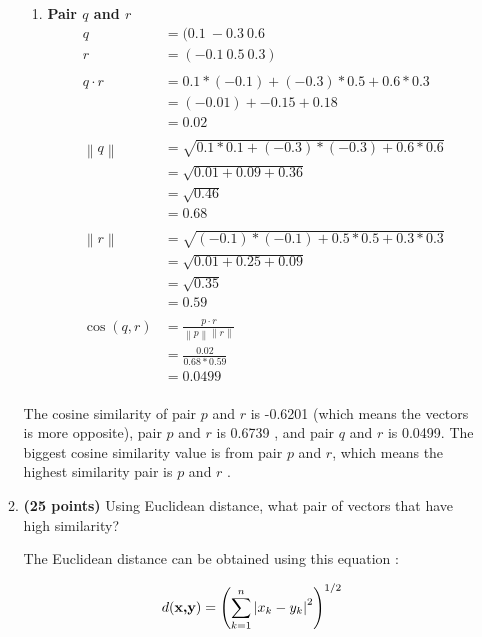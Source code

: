 \documentclass[12pt]{article}%
\begin{document}
\begin{enumerate}
\begin{enumerate}
\begin{enumerate}
			\item \textbf{Pair $q$ and $r$}
			\begin{align*}
				 q & = (0.1 \ -0.3 \ 0.6 \\ 
				 r & = (-0.1 \ 0.5 \ 0.3) \\ 
				 \\
				 q \cdot r & = 0.1 * (-0.1) + (-0.3) * 0.5 + 0.6 * 0.3 \\
				 & = (-0.01) + -0.15 + 0.18 \\
				 & = 0.02\\ 
				 \\
				\left \| q \right \| & = \sqrt{0.1 * 0.1 + (-0.3) * (-0.3) + 0.6*0.6} \\
				 & = \sqrt{0.01 + 0.09 + 0.36} \\ 
				 & = \sqrt{0.46} \\
				 & = 0.68 \\
				 \\
				 \left \| r \right \| & = \sqrt{(-0.1) * (-0.1) + 0.5 * 0.5 + 0.3*0.3} \\
				 & = \sqrt{0.01 + 0.25 + 0.09} \\ 
				 & = \sqrt{0.35} \\
				 & = 0.59 \\
				 \\
				 \cos (q,r) & = \frac{p\cdot r}{\left \| p \right \| \left \| r \right \|} \\
				 & = \frac{0.02}{0.68 * 0.59} \\
				 & = 0.0499\\ %
			\end{align*}
		\end{enumerate}

		\par The cosine similarity of pair $p$ and $r$ is -0.6201 (which means the vectors is more opposite), pair $p$ and $r$ is 0.6739 , and pair $q$ and $r$ is 0.0499. The biggest cosine similarity value is from pair $p$ and $r$, which means the highest similarity pair is $p$ and $r$ .


		\item \textbf{(25 points)} Using Euclidean distance, what pair of vectors that have high similarity?
		\par The Euclidean distance can be obtained using this equation : 

		\begin{equation}
			d(\textbf{\textup{x,y}}) = \left ( \sum_{k=1}^{n} \left | x_k - y_k \right |^2 \right)^{1/2}
		\end{equation}


\end{enumerate}
\end{enumerate}
\end{document}
